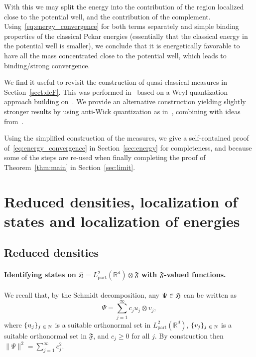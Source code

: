 \documentclass[10pt]{amsart}
\theoremstyle{definition}\newtheorem{defi}[theo]{Definition}\newtheorem{rema}[theo]{Remark}\newtheorem{exam}[theo]{Example}\newtheorem{exem}[theo]{Example}\newtheorem{nota}[theo]{Notation}
\DeclareMathOperator{\partt}{part}
\newcommand{\bN}{\mathbb{N}}
\newcommand{\R}{\mathbb{R}}
\newcommand{\gH}{\mathfrak{H}}
\newcommand{\gF}{\mathfrak{F}}
\newcommand{\1}{\mathds{1}}
\let\oldin\in
\renewcommand{\in}{\mathchoice{\oldin}{\oldin}{\,\oldin\,}{\,\oldin\,}}
\newcounter{setofstep}
\newcounter{step}[setofstep]
\begin{document}
With this we may split the energy into the contribution of the region localized close to the potential well, and the contribution of the complement. Using~\eqref{eq:energy_convergence} for both terms separately and simple binding properties of the classical Pekar energies (essentially that the classical energy in the potential well is smaller), we conclude that it is energetically favorable to have all the mass concentrated close to the potential well, which leads to binding/strong convergence.

We find it useful to revisit the construction of quasi-classical measures in Section~\ref{sect:deF}. This was performed in~\cite{CorFal-18,CorFalOli-19b,CorFalOli-20,CorFalOli-19} based on a Weyl quantization approach building on~\cite{AmmNie-08,AmmNie-09}. We provide an alternative construction yielding slightly stronger results by using anti-Wick quantization as in~\cite{LewNamRou-14,LewNamRou-14d}, combining with ideas from~\cite{FanLewVer-88}.

Using the simplified construction of the measures, we give a self-contained proof of~\eqref{eq:energy_convergence} in Section~\ref{sec:energy} for completeness, and because some of the steps are re-used when finally completing the proof of Theorem~\ref{thm:main} in Section~\ref{sec:limit}.


\section{Reduced densities, localization of states and localization of energies} \label{sect:loc}

\subsection{Reduced densities}\label{sec:DMs}


\paragraph{Identifying states on $ \gH=L^2_{\partt}(\R^d)\otimes\gF$ with $\gF$-valued functions.}
We recall that, by the Schmidt decomposition, any $\Psi\in  \gH$ can be written as
\begin{equation}\label{eq:schmidt}
\Psi= \sum_{j=1}^\infty c_j u_j\otimes v_j,
\end{equation}
where $\{u_j\}_{j\in\bN}$ is a suitable orthonormal set in $L^2_{\partt}(\R^d)$, $\{v_j\}_{j\in\bN}$ is a suitable orthonormal set in $\gF$, and $c_j\ge0$ for all $j$. By construction then $\|\Psi\|^2=\sum_{j=1}^\infty c_j^2$.
\end{document}
